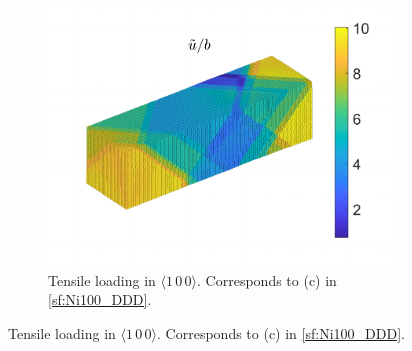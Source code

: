 \begin{figure}
    \begin{subfigure}[t]{0.45\linewidth}
        \centering
        \includegraphics[width=\linewidth]{../data/16-Mar-2021_8_tensile_ni_100_214400_disp.pdf}
        \caption{Tensile loading in $\langle 1\, 0\, 0 \rangle$. Corresponds to (c) in \cref{sf:Ni100_DDD}.}
        \label{sf:Ni100b_disp}
    \end{subfigure}


\end{figure}
